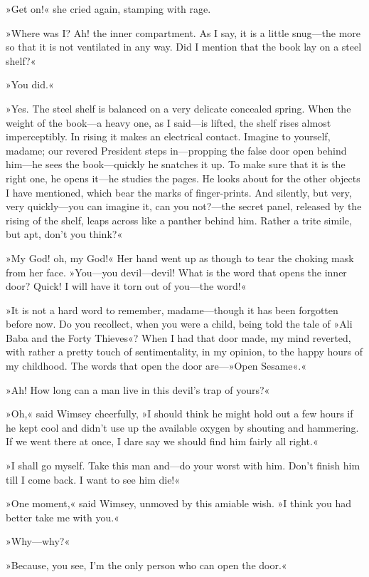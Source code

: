»Get on!« she cried again, stamping with rage.

»Where was I? Ah! the inner compartment. As I say, it is a little snug—the more so that it is not ventilated in any way. Did I mention that the book lay on a steel shelf?«

»You did.«

»Yes. The steel shelf is balanced on a very delicate concealed spring. When the weight of the book—a heavy one, as I said—is lifted, the shelf rises almost imperceptibly. In rising it makes an electrical contact. Imagine to yourself, madame; our revered President steps in—propping the false door open behind him—he sees the book—quickly he snatches it up. To make sure that it is the right one, he opens it—he studies the pages. He looks about for the other objects I have mentioned, which bear the marks of finger-prints. And silently, but very, very quickly—you can imagine it, can you not?—the secret panel, released by the rising of the shelf, leaps across like a panther behind him. Rather a trite simile, but apt, don't you think?«

»My God! oh, my God!« Her hand went up as though to tear the choking mask from her face. »You—you devil—devil! What is the word that opens the inner door? Quick! I will have it torn out of you—the word!«

»It is not a hard word to remember, madame—though it has been forgotten before now. Do you recollect, when you were a child, being told the tale of »Ali Baba and the Forty Thieves«? When I had that door made, my mind reverted, with rather a pretty touch of sentimentality, in my opinion, to the happy hours of my childhood. The words that open the door are—»Open Sesame«.«

»Ah! How long can a man live in this devil's trap of yours?«

»Oh,« said Wimsey cheerfully, »I should think he might hold out a few hours if he kept cool and didn't use up the available oxygen by shouting and hammering. If we went there at once, I dare say we should find him fairly all right.«

»I shall go myself. Take this man and—do your worst with him. Don't finish him till I come back. I want to see him die!«

»One moment,« said Wimsey, unmoved by this amiable wish. »I think you had better take me with you.«

»Why—why?«

»Because, you see, I'm the only person who can open the door.«

